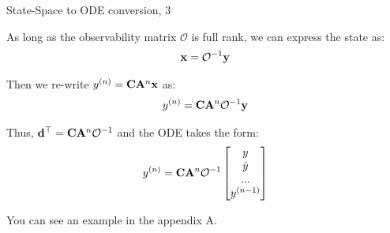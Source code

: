 \documentclass{beamer}
\begin{document}
{
\begin{frame}{State-Space to ODE conversion, 3}
	\begin{flushleft}
		
		As long as the observability matrix $\mathcal{O}$ is full rank, we can express the state as: 
		\begin{align}
			\mathbf{x}=\mathcal{O}^{-1}\mathbf{y}
		\end{align}
		
		Then we re-write $y^{(n)} = \mathbf{C}\mathbf{A}^n\mathbf{x}$ as:
		\begin{align}
			y^{(n)} = \mathbf{C}\mathbf{A}^n\mathcal{O}^{-1}\mathbf{y}
		\end{align}
		
		Thus, $\mathbf{d}^\top = \mathbf{C}\mathbf{A}^n\mathcal{O}^{-1}$ and the ODE takes the form:
		\begin{align}
			y^{(n)} = \mathbf{C}\mathbf{A}^n\mathcal{O}^{-1}
			\begin{bmatrix}
				y \\ \dot y \\ ... \\ y^{(n-1)} 
			\end{bmatrix}
		\end{align}
		
		You can see an example in the appendix A.
		
		
	\end{flushleft}
\end{frame}
}
\end{document}
